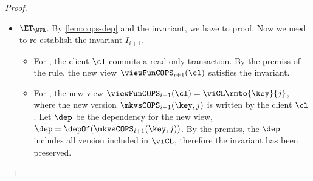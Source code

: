 \begin{proof}
\begin{itemize}
        \item \( \ET_\WFR \).
            By \cref{lem:cops-dep} and the invariant, we have to proof.
            Now we need to re-establish the invariant \( I_{i+1} \).
            \begin{itemize}
                \item 
                For , the client \( \cl \) commits a read-only transaction.
                By the premiss of the rule, the new view \( \viewFunCOPS_{i+1}(\cl) \) satisfies the invariant.
                \item For , the new view \( \viewFunCOPS_{i+1}(\cl) = \viCL\rmto{\key}{j} \),
                where the new version \( \mkvsCOPS_{i+1}(\key,j)\) is written by the client \( \cl \).
                Let \( \dep \) be the dependency for the new view, \ie \( \dep = \depOf(\mkvsCOPS_{i+1}(\key,j)) \).
                By the premiss, the \( \dep \) includes all version included in \( \viCL \), 
                therefore the invariant has been preserved.
            \end{itemize}
    \end{itemize}
\end{proof}

